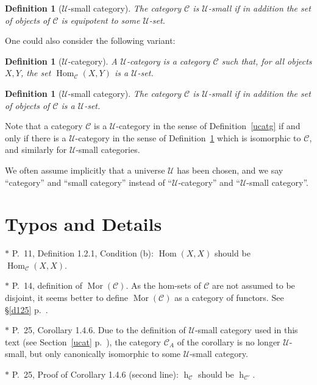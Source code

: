 \documentclass[12pt]{article}
\newtheorem{df}[thm]{Definition}
\theoremstyle{remark}
\theoremstyle{definition}
\newcommand{\nn}{\noindent}
\newcommand{\C}{\mathcal C}
\newcommand{\U}{\mathcal U}
\DeclareMathOperator{\hy}{h}
\DeclareMathOperator{\Hom}{Hom}
\DeclareMathOperator{\Mor}{Mor}
\begin{document}
\begin{df}[$\U$-small category] 
The category $\C$ is $\U$-{\em small} if in addition the set of objects of $\C$ is equipotent to some $\U$-set. 
\end{df} 

One could also consider the following variant: 

\begin{df}[$\U$-category]\label{ducat} 
A $\U$-{\em category} is a category $\C$ such that, for all objects $X,Y$, the set $\Hom_\C(X,Y)$ is a $\U$-set. 
\end{df} 

\begin{df}[$\U$-small category]\label{small}
The category $\C$ is $\U$-{\em small}\index{$\U$-small category} if in addition the set of objects of $\C$ is a $\U$-set. 
\end{df} 

Note that a category $\C$ is a $\U$-category in the sense of Definition~\ref{ucatg} if and only if there is a $\U$-category in the sense of Definition~\ref{ducat} which is isomorphic to $\C$, and similarly for $\U$-small categories. 
%
\begin{center}
\end{center}

We often assume implicitly that a universe $\U$ has been chosen, and we say ``category'' and ``small category'' instead of ``$\U$-category'' and ``$\U$-small category''.


\section{Typos and Details}

$*$ P.~11, Definition 1.2.1, Condition (b): $\Hom(X,X)$ should be $\Hom_{\C}(X,X)$. 

\nn$*$ P.~14, definition of $\Mor(\C)$. As the hom-sets of $\C$ are not assumed to be disjoint, it seems better to define $\Mor(\C)$ as a category of functors. See \S\ref{d125} p.~\pageref{d125}. 

\nn$*$ P.~25, Corollary 1.4.6. Due to the definition of $\U$-small category used in this text (see Section~\ref{ucat} p.~\pageref{ucat}), the category $\C_A$ of the corollary is no longer $\U$-small, but only canonically isomorphic to some $\U$-small category. 

\nn$*$ P.~25, Proof of Corollary 1.4.6 (second line): $\hy_{\C}$ should be $\hy_{\C'}$. 
\end{document}
